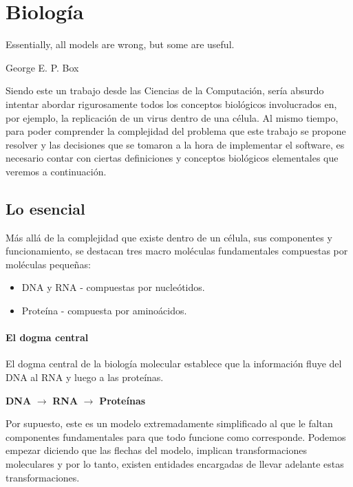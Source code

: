 \chapter{Biolog\'ia}
\label{biologia}
\epigraph{Essentially, all models are wrong, but some are useful.}%
{George E. P. Box}

Siendo este un trabajo desde las Ciencias de la Computaci\'on, ser\'ia absurdo
intentar abordar rigurosamente todos los conceptos biol\'ogicos involucrados
en, por ejemplo, la replicaci\'on de un virus dentro de una c\'elula. Al mismo
tiempo, para poder comprender la complejidad del problema que este trabajo se
propone resolver y las decisiones que se tomaron a la hora de implementar el
software, es necesario contar con ciertas definiciones y conceptos biol\'ogicos
elementales que veremos a continuaci\'on.

\section{Lo esencial}
\label{bio-esencial}

M\'as all\'a de la complejidad que existe dentro de un c\'elula, sus componentes
y funcionamiento, se destacan tres macro mol\'eculas fundamentales compuestas
por mol\'eculas peque\~nas:
\begin{itemize}
 \item \ac{DNA} y \ac{RNA} - compuestas por nucle\'otidos. 
 \item Prote\'ina - compuesta por amino\'acidos.
\end{itemize}

\subsubsection{El dogma central}

El dogma central de la biolog\'ia molecular establece que la informaci\'on
fluye del \ac{DNA} al \ac{RNA} y luego a las prote\'inas.
\begin{center}
 \textbf{DNA} $\longrightarrow$ \textbf{RNA} $\longrightarrow$
\textbf{Prote\'inas}
\end{center}

Por supuesto, este es un modelo extremadamente simplificado al que le faltan
componentes fundamentales para que todo funcione como corresponde. Podemos
empezar diciendo que las flechas del modelo, implican transformaciones
moleculares y por lo tanto, existen entidades encargadas de llevar adelante
estas transformaciones. 

